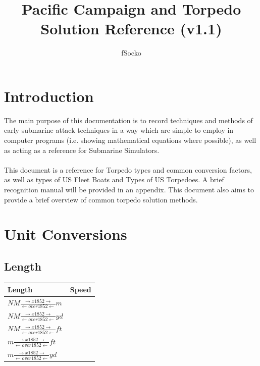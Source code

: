 \documentclass{article}
\author{fSocko}
\title{Pacific Campaign and Torpedo Solution Reference (v1.1)}
\begin{document}
\maketitle
\pagebreak
\tableofcontents
\pagebreak

\section{Introduction}
The main purpose of this documentation is to record techniques and methods of early submarine attack techniques in a way which are simple to employ in computer programs (i.e. showing mathematical equations where possible), as well as acting as a reference for Submarine Simulators.
\\ \\
This document is a reference for Torpedo types and common conversion factors, as well as types of US Fleet Boats and Types of US Torpedoes. A brief recognition manual will be provided in an appendix. This document also aims to provide a brief overview of common torpedo solution methods.

\section{Unit Conversions}

\subsection{Length}

\begin{center}
\setlength{\extrarowheight}{24pt}
\begin{huge}
\begin{tabularx}{\textwidth}{Y | Y}
 Length & Speed \\
\hline
$ NM  \frac{\rightarrow x1852 \rightarrow}{ \leftarrow over 1852 \leftarrow} m$ & \\
$ NM  \frac{\rightarrow x1852 \rightarrow}{ \leftarrow over 1852 \leftarrow} yd$ & \\
$ NM  \frac{\rightarrow x1852 \rightarrow}{ \leftarrow over 1852 \leftarrow} ft$ & \\
$ m  \frac{\rightarrow x1852 \rightarrow}{ \leftarrow over 1852 \leftarrow} ft$ & \\
$ m  \frac{\rightarrow x1852 \rightarrow}{ \leftarrow over 1852 \leftarrow} yd$ & \\
\end{tabularx}
\end{huge}
\end{center}
\end{document}
